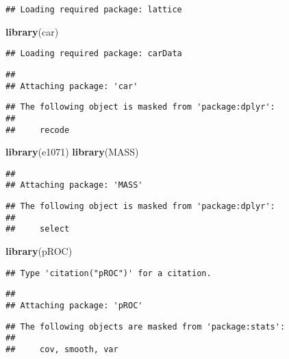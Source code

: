 \documentclass[
]{article}
\newenvironment{Shaded}{\begin{snugshade}}{\end{snugshade}}
\newcommand{\FunctionTok}[1]{\textcolor[rgb]{0.13,0.29,0.53}{\textbf{#1}}}
\newcommand{\NormalTok}[1]{#1}
\begin{document}
\begin{verbatim}
## Loading required package: lattice
\end{verbatim}

\begin{Shaded}
\begin{Highlighting}[]
\FunctionTok{library}\NormalTok{(car)}
\end{Highlighting}
\end{Shaded}

\begin{verbatim}
## Loading required package: carData
\end{verbatim}

\begin{verbatim}
## 
## Attaching package: 'car'
\end{verbatim}

\begin{verbatim}
## The following object is masked from 'package:dplyr':
## 
##     recode
\end{verbatim}

\begin{Shaded}
\begin{Highlighting}[]
\FunctionTok{library}\NormalTok{(e1071)}
\FunctionTok{library}\NormalTok{(MASS)}
\end{Highlighting}
\end{Shaded}

\begin{verbatim}
## 
## Attaching package: 'MASS'
\end{verbatim}

\begin{verbatim}
## The following object is masked from 'package:dplyr':
## 
##     select
\end{verbatim}

\begin{Shaded}
\begin{Highlighting}[]
\FunctionTok{library}\NormalTok{(pROC)}
\end{Highlighting}
\end{Shaded}

\begin{verbatim}
## Type 'citation("pROC")' for a citation.
\end{verbatim}

\begin{verbatim}
## 
## Attaching package: 'pROC'
\end{verbatim}

\begin{verbatim}
## The following objects are masked from 'package:stats':
## 
##     cov, smooth, var
\end{verbatim}
\end{document}
